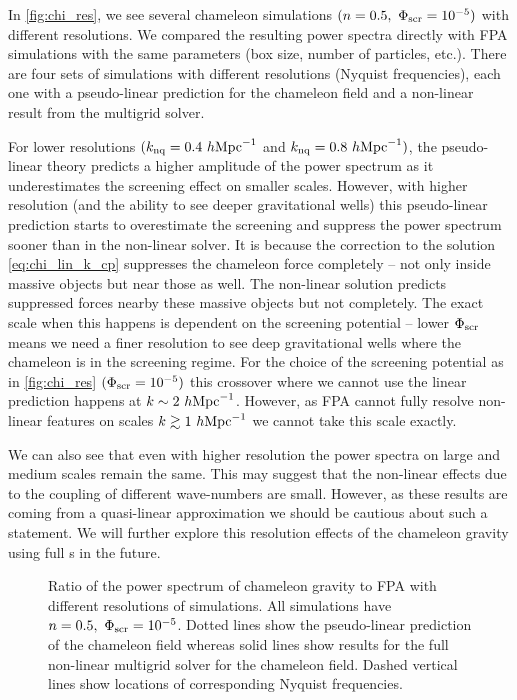 In \autoref{fig:chi_res}, we see several chameleon simulations $(n=0.5,\ \Phi_{\text{\scriptsize scr}}=10^{-5})$ with different resolutions. We compared the resulting power spectra directly with FPA simulations with the same parameters (box size, number of particles, etc.). There are four sets of simulations with different resolutions (Nyquist frequencies), each one with a pseudo-linear prediction for the chameleon field and a non-linear result from the multigrid solver.

For lower resolutions $(k_{\rm nq} = 0.4~h\text{Mpc}^{-1}$ and $k_{\rm nq} = 0.8~h\text{Mpc}^{-1})$, the pseudo-linear theory predicts a higher amplitude of the power spectrum as it underestimates the screening effect on smaller scales. However, with higher resolution (and the ability to see deeper gravitational wells) this pseudo-linear prediction starts to overestimate the screening and suppress the power spectrum sooner than in the non-linear solver. It is because the correction to the solution \eqref{eq:chi_lin_k_cp} suppresses the chameleon force completely -- not only inside massive objects but near those as well. The non-linear solution predicts suppressed forces nearby these massive objects but not completely. The exact scale when this happens is dependent on the screening potential -- lower $\Phi_{\text{\scriptsize scr}}$ means we need a finer resolution to see deep gravitational wells where the chameleon is in the screening regime. For the choice of the screening potential as in \autoref{fig:chi_res} $(\Phi_{\text{\scriptsize scr}}=10^{-5})$ this crossover where we cannot use the linear prediction happens at $k\sim2~h\text{Mpc}^{-1}$. However, as FPA cannot fully resolve non-linear features on scales $k\gtrsim1~h\text{Mpc}^{-1}$  we cannot take this scale exactly.

We can also see that even with higher resolution the power spectra on large and medium scales remain the same. This may suggest that the non-linear effects due to the coupling of different wave-numbers are small. However, as these results are coming from a quasi-linear approximation we should be cautious about such a statement. We will further explore this resolution effects of the chameleon gravity using full \nbodysim s in the future.

\begin{figure}
  \centering
	\begin{subfigure}{0.85\textwidth}
	\end{subfigure}
	\begin{subfigure}{0.85\textwidth}
	\end{subfigure}
  \caption{Ratio of the power spectrum of chameleon gravity to FPA with different resolutions of simulations. All simulations have $n=0.5,\ \Phi_{\text{\scriptsize scr}}=10^{-5}$. Dotted lines show the pseudo-linear prediction of the chameleon field whereas solid lines show results for the full non-linear multigrid solver for the chameleon field. Dashed vertical lines show locations of corresponding Nyquist frequencies.}
  \label{fig:chi_res}
\end{figure}

